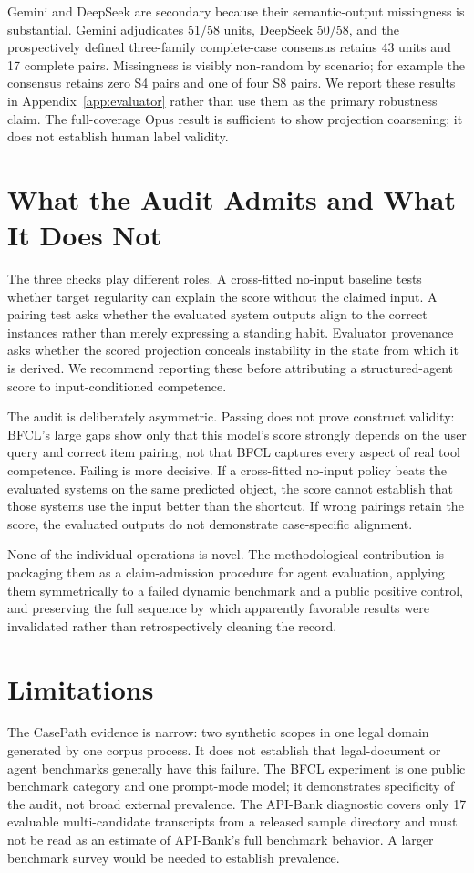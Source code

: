 \documentclass{article}
\begin{document}
Gemini and DeepSeek are secondary because their semantic-output missingness is substantial. Gemini adjudicates 51/58 units, DeepSeek 50/58, and the prospectively defined three-family complete-case consensus retains 43 units and 17 complete pairs. Missingness is visibly non-random by scenario; for example the consensus retains zero S4 pairs and one of four S8 pairs. We report these results in Appendix~\ref{app:evaluator} rather than use them as the primary robustness claim. The full-coverage Opus result is sufficient to show projection coarsening; it does not establish human label validity.

\section{What the Audit Admits and What It Does Not}
The three checks play different roles. A cross-fitted no-input baseline tests whether target regularity can explain the score without the claimed input. A pairing test asks whether the evaluated system outputs align to the correct instances rather than merely expressing a standing habit. Evaluator provenance asks whether the scored projection conceals instability in the state from which it is derived. We recommend reporting these before attributing a structured-agent score to input-conditioned competence.

The audit is deliberately asymmetric. Passing does not prove construct validity: BFCL's large gaps show only that this model's score strongly depends on the user query and correct item pairing, not that BFCL captures every aspect of real tool competence. Failing is more decisive. If a cross-fitted no-input policy beats the evaluated systems on the same predicted object, the score cannot establish that those systems use the input better than the shortcut. If wrong pairings retain the score, the evaluated outputs do not demonstrate case-specific alignment.

None of the individual operations is novel. The methodological contribution is packaging them as a claim-admission procedure for agent evaluation, applying them symmetrically to a failed dynamic benchmark and a public positive control, and preserving the full sequence by which apparently favorable results were invalidated rather than retrospectively cleaning the record.

\section{Limitations}
The CasePath evidence is narrow: two synthetic scopes in one legal domain generated by one corpus process. It does not establish that legal-document or agent benchmarks generally have this failure. The BFCL experiment is one public benchmark category and one prompt-mode model; it demonstrates specificity of the audit, not broad external prevalence. The API-Bank diagnostic covers only 17 evaluable multi-candidate transcripts from a released sample directory and must not be read as an estimate of API-Bank's full benchmark behavior. A larger benchmark survey would be needed to establish prevalence.
\end{document}
